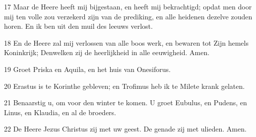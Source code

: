\par 17 Maar de Heere heeft mij bijgestaan, en heeft mij bekrachtigd; opdat men door mij ten volle zou verzekerd zijn van de prediking, en alle heidenen dezelve zouden horen. En ik ben uit den muil des leeuws verlost.
\par 18 En de Heere zal mij verlossen van alle boos werk, en bewaren tot Zijn hemels Koninkrijk; Denwelken zij de heerlijkheid in alle eeuwigheid. Amen.
\par 19 Groet Priska en Aquila, en het huis van Onesiforus.
\par 20 Erastus is te Korinthe gebleven; en Trofimus heb ik te Milete krank gelaten.
\par 21 Benaarstig u, om voor den winter te komen. U groet Eubulus, en Pudens, en Linus, en Klaudia, en al de broeders.
\par 22 De Heere Jezus Christus zij met uw geest. De genade zij met ulieden. Amen.




